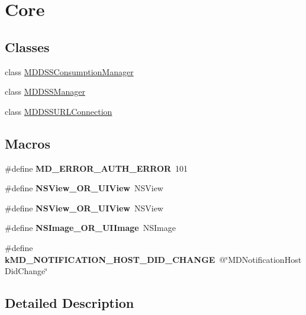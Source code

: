 \hypertarget{group__core}{\section{Core}
\label{group__core}
}
\subsection*{Classes}
\begin{DoxyCompactItemize}
\item 
class \hyperlink{interface_m_d_d_s_s_consumption_manager}{M\-D\-D\-S\-S\-Consumption\-Manager}
\item 
class \hyperlink{interface_m_d_d_s_s_manager}{M\-D\-D\-S\-S\-Manager}
\item 
class \hyperlink{interface_m_d_d_s_s_u_r_l_connection}{M\-D\-D\-S\-S\-U\-R\-L\-Connection}
\end{DoxyCompactItemize}
\subsection*{Macros}
\begin{DoxyCompactItemize}
\item 
\hypertarget{group__core_gac6ab395e1ae0b90a69ffb688774f183e}{\#define {\bfseries M\-D\-\_\-\-E\-R\-R\-O\-R\-\_\-\-A\-U\-T\-H\-\_\-\-E\-R\-R\-O\-R}~101}\label{group__core_gac6ab395e1ae0b90a69ffb688774f183e}

\item 
\hypertarget{group__core_gad5a8833d6f44cb6b66758c7673566fc0}{\#define {\bfseries N\-S\-View\-\_\-\-O\-R\-\_\-\-U\-I\-View}~N\-S\-View}\label{group__core_gad5a8833d6f44cb6b66758c7673566fc0}

\item 
\hypertarget{group__core_gad5a8833d6f44cb6b66758c7673566fc0}{\#define {\bfseries N\-S\-View\-\_\-\-O\-R\-\_\-\-U\-I\-View}~N\-S\-View}\label{group__core_gad5a8833d6f44cb6b66758c7673566fc0}

\item 
\hypertarget{group__core_gaf97d8fdf99598d4d44ce73f5ce961511}{\#define {\bfseries N\-S\-Image\-\_\-\-O\-R\-\_\-\-U\-I\-Image}~N\-S\-Image}\label{group__core_gaf97d8fdf99598d4d44ce73f5ce961511}

\item 
\hypertarget{group__core_ga40e5ca3f41ac454fc3ec1b82f731eef4}{\#define {\bfseries k\-M\-D\-\_\-\-N\-O\-T\-I\-F\-I\-C\-A\-T\-I\-O\-N\-\_\-\-H\-O\-S\-T\-\_\-\-D\-I\-D\-\_\-\-C\-H\-A\-N\-G\-E}~@\char`\"{}M\-D\-Notification\-Host\-Did\-Change\char`\"{}}\label{group__core_ga40e5ca3f41ac454fc3ec1b82f731eef4}

\end{DoxyCompactItemize}


\subsection{Detailed Description}
